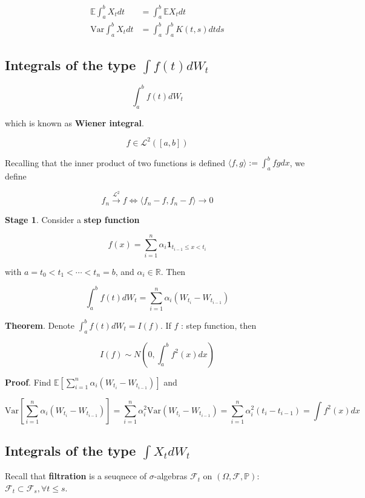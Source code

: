 \documentclass[12pt]{article}
\theoremstyle{nonumberbreak}
\begin{document}
$$
\begin{aligned}
\mathbb{E} \int_a^b X_t dt &= \int_a^b \mathbb{E}X_t dt \\[8pt]
\mathrm{Var} \int_a^b X_t dt &= \int_a^b \int_a^b K(t,s) dt ds
\end{aligned}
$$


\subsection{Integrals of the type $\int f(t) d W_t$}

$$
\int_a^b f(t) dW_t
$$

which is known as \textbf{Wiener integral}. 

$$
f \in \mathcal{L}^2 \left( [a,b] \right)
$$

Recalling that the inner product of two functions is defined $\langle f,g \rangle := \int_a^b fg dx$, we define

$$
f_n \overset{\mathcal{L}^2}{\to} f \Leftrightarrow \langle f_n -f, f_n-f\rangle \to 0
$$


\textbf{Stage 1}. Consider a \textbf{step function}

$$
f(x) = \sum_{i=1}^n \alpha_i \mathbf{1}_{t_{i-1} \le x < t_i}
$$

with $a = t_0 < t_1 < \cdots < t_n = b$, and $\alpha_i \in \mathbb{R}$. Then 

$$
\int_a^b f(t) dW_t = \sum_{i=1}^n \alpha_i \left( W_{t_i} - W_{t_{i-1}} \right)
$$


\begin{theorem}
\textbf{Theorem}. Denote $\int_a^b f(t) dW_t = I(f)$. If $f$ : step function, then

$$
I(f) \sim N \left(0, \int_a^b f^2(x) dx \right)
$$
\end{theorem}

\textbf{Proof}. Find $\mathbb{E} \left[ \sum_{i=1}^n \alpha_i \left( W_{t_i} - W_{t_{i-1}} \right) \right]$ and 

$$
\mathrm{Var} \left[ \sum_{i=1}^n \alpha_i \left( W_{t_i} - W_{t_{i-1}} \right) \right] = \sum_{i=1}^n \alpha_i^2 \mathrm{Var} \left( W_{t_i} - W_{t_{i-1}}\right) = \sum_{i=1}^n \alpha_i^2 (t_i - t_{i-1}) = \int f^2(x) dx
$$


\subsection{Integrals of the type $\int X_t d W_t$}

Recall that \textbf{filtration} is a seuqnece of $\sigma$-algebras $\mathcal{F}_t$ on $(\Omega, \mathcal{F}, \mathbb{P})$: $\mathcal{F}_t \subset \mathcal{F}_s, \forall t \le s$. 
\end{document}
